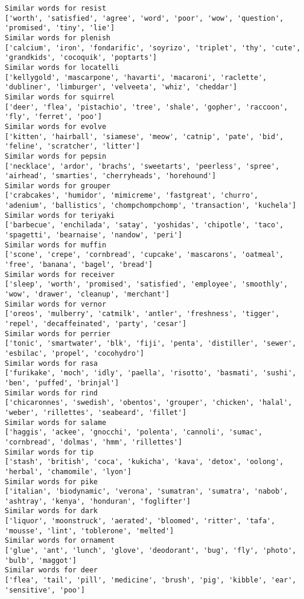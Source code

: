 \documentclass[11pt]{article}
\begin{document}
\begin{Verbatim}[commandchars=\\\{\}]
Similar words for resist
['worth', 'satisfied', 'agree', 'word', 'poor', 'wow', 'question', 'promised', 'tiny', 'lie']
Similar words for plenish
['calcium', 'iron', 'fondarific', 'soyrizo', 'triplet', 'thy', 'cute', 'grandkids', 'cocoquik', 'poptarts']
Similar words for locatelli
['kellygold', 'mascarpone', 'havarti', 'macaroni', 'raclette', 'dubliner', 'limburger', 'velveeta', 'whiz', 'cheddar']
Similar words for squirrel
['deer', 'flea', 'pistachio', 'tree', 'shale', 'gopher', 'raccoon', 'fly', 'ferret', 'poo']
Similar words for evolve
['kitten', 'hairball', 'siamese', 'meow', 'catnip', 'pate', 'bid', 'feline', 'scratcher', 'litter']
Similar words for pepsin
['necklace', 'ardor', 'brachs', 'sweetarts', 'peerless', 'spree', 'airhead', 'smarties', 'cherryheads', 'horehound']
Similar words for grouper
['crabcakes', 'humidor', 'mimicreme', 'fastgreat', 'churro', 'adenium', 'ballistics', 'chompchompchomp', 'transaction', 'kuchela']
Similar words for teriyaki
['barbecue', 'enchilada', 'satay', 'yoshidas', 'chipotle', 'taco', 'spagetti', 'bearnaise', 'nandow', 'peri']
Similar words for muffin
['scone', 'crepe', 'cornbread', 'cupcake', 'mascarons', 'oatmeal', 'free', 'banana', 'bagel', 'bread']
Similar words for receiver
['sleep', 'worth', 'promised', 'satisfied', 'employee', 'smoothly', 'wow', 'drawer', 'cleanup', 'merchant']
Similar words for vernor
['oreos', 'mulberry', 'catmilk', 'antler', 'freshness', 'tigger', 'repel', 'decaffeinated', 'party', 'cesar']
Similar words for perrier
['tonic', 'smartwater', 'blk', 'fiji', 'penta', 'distiller', 'sewer', 'esbilac', 'propel', 'cocohydro']
Similar words for rasa
['furikake', 'moch', 'idly', 'paella', 'risotto', 'basmati', 'sushi', 'ben', 'puffed', 'brinjal']
Similar words for rind
['chicaronnes', 'swedish', 'obentos', 'grouper', 'chicken', 'halal', 'weber', 'rillettes', 'seabeard', 'fillet']
Similar words for salame
['haggis', 'ackee', 'gnocchi', 'polenta', 'cannoli', 'sumac', 'cornbread', 'dolmas', 'hmm', 'rillettes']
Similar words for tip
['stash', 'british', 'coca', 'kukicha', 'kava', 'detox', 'oolong', 'herbal', 'chamomile', 'lyon']
Similar words for pike
['italian', 'biodynamic', 'verona', 'sumatran', 'sumatra', 'nabob', 'ashtray', 'kenya', 'honduran', 'foglifter']
Similar words for dark
['liquor', 'moonstruck', 'aerated', 'bloomed', 'ritter', 'tafa', 'mousse', 'lint', 'toblerone', 'melted']
Similar words for ornament
['glue', 'ant', 'lunch', 'glove', 'deodorant', 'bug', 'fly', 'photo', 'bulb', 'maggot']
Similar words for deer
['flea', 'tail', 'pill', 'medicine', 'brush', 'pig', 'kibble', 'ear', 'sensitive', 'poo']

\end{Verbatim}
\end{document}

